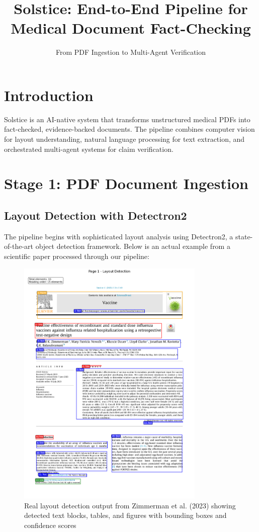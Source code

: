 \documentclass[11pt]{article}
\title{\textbf{Solstice: End-to-End Pipeline for Medical Document Fact-Checking}}
\author{From PDF Ingestion to Multi-Agent Verification}
\date{}
\begin{document}
\maketitle

\section{Introduction}

Solstice is an AI-native system that transforms unstructured medical PDFs into fact-checked, evidence-backed documents. The pipeline combines computer vision for layout understanding, natural language processing for text extraction, and orchestrated multi-agent systems for claim verification.

\section{Stage 1: PDF Document Ingestion}

\subsection{Layout Detection with Detectron2}

The pipeline begins with sophisticated layout analysis using Detectron2, a state-of-the-art object detection framework. Below is an actual example from a scientific paper processed through our pipeline:

\begin{figure}[htbp]
\centering
\includegraphics[width=0.8\textwidth]{scientific_layout_example.png}
\caption{Real layout detection output from Zimmerman et al. (2023) showing detected text blocks, tables, and figures with bounding boxes and confidence scores}
\end{figure}
\end{document}
